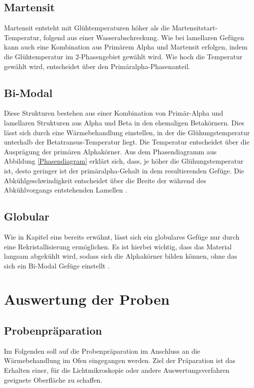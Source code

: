 \documentclass[a4paper, 11pt]{tubsreprt}
\begin{document}
\subsection{Martensit}
Martensit entsteht mit Glühtemperaturen höher als die Martensitstart-Temperatur, folgend aus einer Wasserabschreckung. Wie bei lamellaren Gefügen kann auch eine Kombination aus Primärem Alpha und Martensit erfolgen, indem die Glühtemperatur im 2-Phasengebiet gewählt wird. Wie hoch die Temperatur gewählt wird, entscheidet über den Primäralpha-Phasenanteil.

\subsection{Bi-Modal}
Diese Strukturen bestehen aus einer Kombination von Primär-Alpha und lamellaren Strukturen aus Alpha und Beta in den ehemaligen Betakörnern. Dies lässt sich durch eine Wärmebehandlung einstellen, in der die Glühungstemperatur unterhalb der Betatransus-Temperatur liegt. Die Temperatur entscheidet über die Ausprägung der primären Alphakörner. Aus dem Phasendiagramm aus Abbildung \ref{Phasendiagram} erklärt sich, dass, je höher die Glühungstemperatur ist, desto geringer ist der primäralpha-Gehalt in dem resultierenden Gefüge. Die Abkühlgeschwindigkeit entscheidet über die Breite der während des Abkühlvorgangs entstehenden Lamellen \cite{Luetjering2007}.

\subsection{Globular}
Wie in Kapitel eins bereits erwähnt, lässt sich ein globulares Gefüge nur durch eine Rekristallisierung ermöglichen. Es ist hierbei wichtig, dass das Material langsam abgekühlt wird, sodass sich die Alphakörner bilden können, ohne das sich ein Bi-Modal Gefüge einstellt \cite{Luetjering2007}.

\section{Auswertung der Proben}
\subsection{Probenpräparation}\label{Kapitel Probenpräperation}
Im Folgenden soll auf die Probenpräparation im Anschluss an die Wärmebehandlung im Ofen eingegangen werden. Ziel der Präparation ist das Erhalten einer, für die Lichtmikroskopie oder andere Auswertungsverfahren geeignete Oberfläche zu schaffen. 
\end{document}
